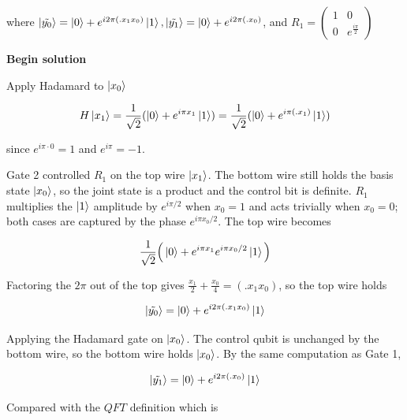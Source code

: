 \documentclass[11pt]{article}
\newcommand{\invsq}{\frac{1}{\sqrt{2}}}
\begin{document}
\begin{enumerate}
\begin{enumerate}
		            \raggedright
		            where $\ket{\tilde{y_0}} = \ket{0} + e^{i2\pi(.x_1x_0)}\ket{1}, \ket{\tilde{y_1}} = \ket{0} + e^{i2\pi(.x_0)}$, and $R_1 = \begin{pmatrix} 1 & 0 \\ 0 & e^{\frac{i\pi}{2}} \end{pmatrix}$

		            \textbf{Begin solution}

		            Apply Hadamard to $\ket{x_0}$

		            \begin{equation*}
			            H\ket{x_1} = \invsq (\ket{0} + e^{i\pi x_1}\ket{1}) = \invsq (\ket{0} + e^{i\pi (.x_1)}\ket{1})
		            \end{equation*}

		            since $e^{i \pi \cdot 0} = 1$ and $e^{i\pi} = -1$.

		            Gate 2 controlled $R_1$ on the top wire $\ket{x_1}$. The bottom wire still holds the basis state $\ket{x_0}$, so the joint state is a product and the control bit is definite. $R_1$ multiplies the $\ket{1}$ amplitude by $e^{i\pi / 2}$ when $x_0=1$ and acts trivially when $x_0 = 0$; both cases are captured by the phase $e^{i \pi x_0 / 2}$. The top wire becomes

		            \begin{equation*}
			            \invsq\Big(\ket{0}+e^{i{\pi}x_1}e^{i{\pi}x_0/2}\ket{1}\Big)
		            \end{equation*}

		            Factoring the $2\pi$ out of the top gives $\frac{x_1}{2} + \frac{x_0}{4} = (.x_1x_0)$, so the top wire holds

		            \begin{equation*}
			            \ket{\tilde{y_0}} = \ket{0} + e^{i2\pi(.x_1x_0)}\ket{1}
		            \end{equation*}

		            Applying the Hadamard gate on $\ket{x_0}$. The control qubit is unchanged by the bottom wire, so the bottom wire holds $\ket{x_0}$. By the same computation as Gate 1,

		            \begin{equation*}
			            \ket{\tilde{y_1}} = \ket{0} + e^{i2\pi(.x_0)}\ket{1}
		            \end{equation*}

		            Compared with the $QFT$ definition which is


\end{enumerate}
\end{enumerate}
\end{document}

